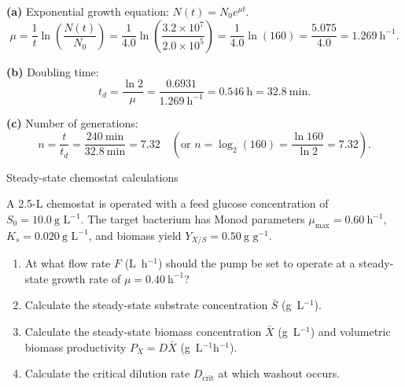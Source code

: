 \documentclass[12pt, a4paper, oneside]{report}
\begin{document}
\begin{solution}
  \textbf{(a)} Exponential growth equation: $N(t) = N_0 e^{\mu t}$.
  \[
    \mu = \frac{1}{t} \ln\!\left(\frac{N(t)}{N_0}\right) = \frac{1}{4.0} \ln\!\left(\frac{3.2 \times 10^7}{2.0 \times 10^5}\right) = \frac{1}{4.0} \ln(160) = \frac{5.075}{4.0} = 1.269~\text{h}^{-1}.
  \]

  \textbf{(b)} Doubling time:
  \[
    t_d = \frac{\ln 2}{\mu} = \frac{0.6931}{1.269~\text{h}^{-1}} = 0.546~\text{h} = 32.8~\text{min}.
  \]

  \textbf{(c)} Number of generations:
  \[
    n = \frac{t}{t_d} = \frac{240~\text{min}}{32.8~\text{min}} = 7.32 \quad \left(\text{or } n = \log_2(160) = \frac{\ln 160}{\ln 2} = 7.32\right).
  \]
\end{solution}

\begin{problem}{\enspace{}\enspace
  Steady-state chemostat calculations}

  A 2.5-L chemostat is operated with a feed glucose concentration of $S_0 = 10.0~\text{g~L}^{-1}$. The target bacterium has Monod parameters $\mu_{\max} = 0.60~\text{h}^{-1}$, $K_s = 0.020~\text{g~L}^{-1}$, and biomass yield $Y_{X/S} = 0.50~\text{g~g}^{-1}$.

  \begin{enumerate}
    \item At what flow rate $F$ (L~h$^{-1}$) should the pump be set to operate at a steady-state growth rate of $\mu = 0.40~\text{h}^{-1}$?
    \item Calculate the steady-state substrate concentration $\bar{S}$ (g~L$^{-1}$).
    \item Calculate the steady-state biomass concentration $\bar{X}$ (g~L$^{-1}$) and volumetric biomass productivity $P_X = D \bar{X}$ (g~L$^{-1}$h$^{-1}$).
    \item Calculate the critical dilution rate $D_{\text{crit}}$ at which washout occurs.
  \end{enumerate}
\end{problem}
\end{document}

